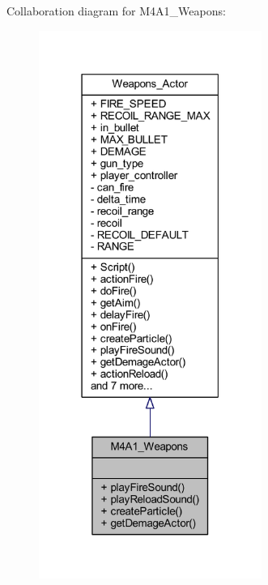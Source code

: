 Collaboration diagram for M4\+A1\+\_\+\+Weapons\+:\nopagebreak
\begin{figure}[H]
\begin{center}
\leavevmode
\includegraphics[width=206pt]{class_m4_a1___weapons__coll__graph}
\end{center}
\end{figure}
